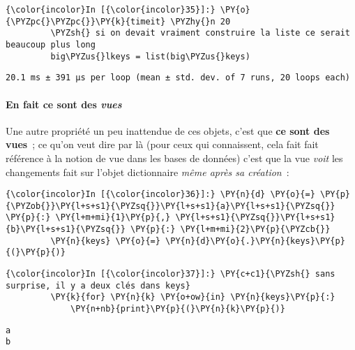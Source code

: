     \begin{Verbatim}[commandchars=\\\{\}]
{\color{incolor}In [{\color{incolor}35}]:} \PY{o}{\PYZpc{}\PYZpc{}}\PY{k}{timeit} \PYZhy{}n 20
         \PYZsh{} si on devait vraiment construire la liste ce serait beaucoup plus long
         big\PYZus{}lkeys = list(big\PYZus{}keys)
\end{Verbatim}


    \begin{Verbatim}[commandchars=\\\{\}]
20.1 ms ± 391 µs per loop (mean ± std. dev. of 7 runs, 20 loops each)

    \end{Verbatim}

    \hypertarget{en-fait-ce-sont-des-vues}{%
\paragraph{\texorpdfstring{En fait ce sont des
\emph{vues}}{En fait ce sont des vues}}\label{en-fait-ce-sont-des-vues}}

    Une autre propriété un peu inattendue de ces objets, c'est que
\textbf{ce sont des vues}~; ce qu'on veut dire par là (pour ceux qui
connaissent, cela fait fait référence à la notion de vue dans les bases
de données) c'est que la vue \emph{voit} les changements fait sur
l'objet dictionnaire \emph{même après sa création}~:

    \begin{Verbatim}[commandchars=\\\{\}]
{\color{incolor}In [{\color{incolor}36}]:} \PY{n}{d} \PY{o}{=} \PY{p}{\PYZob{}}\PY{l+s+s1}{\PYZsq{}}\PY{l+s+s1}{a}\PY{l+s+s1}{\PYZsq{}} \PY{p}{:} \PY{l+m+mi}{1}\PY{p}{,} \PY{l+s+s1}{\PYZsq{}}\PY{l+s+s1}{b}\PY{l+s+s1}{\PYZsq{}} \PY{p}{:} \PY{l+m+mi}{2}\PY{p}{\PYZcb{}}
         \PY{n}{keys} \PY{o}{=} \PY{n}{d}\PY{o}{.}\PY{n}{keys}\PY{p}{(}\PY{p}{)}
\end{Verbatim}


    \begin{Verbatim}[commandchars=\\\{\}]
{\color{incolor}In [{\color{incolor}37}]:} \PY{c+c1}{\PYZsh{} sans surprise, il y a deux clés dans keys}
         \PY{k}{for} \PY{n}{k} \PY{o+ow}{in} \PY{n}{keys}\PY{p}{:}
             \PY{n+nb}{print}\PY{p}{(}\PY{n}{k}\PY{p}{)}
\end{Verbatim}


    \begin{Verbatim}[commandchars=\\\{\}]
a
b

    \end{Verbatim}

